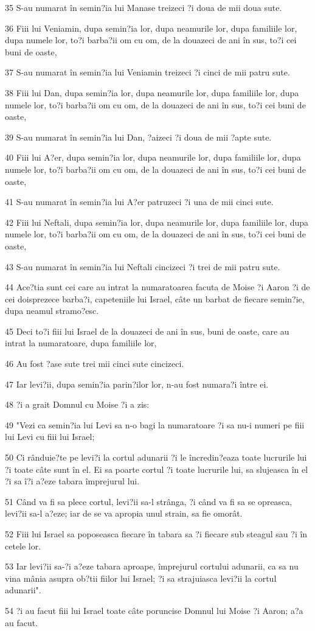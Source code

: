 \par 35 S-au numarat în semin?ia lui Manase treizeci ?i doua de mii doua sute.
\par 36 Fiii lui Veniamin, dupa semin?ia lor, dupa neamurile lor, dupa familiile lor, dupa numele lor, to?i barba?ii om cu om, de la douazeci de ani în sus, to?i cei buni de oaste,
\par 37 S-au numarat în semin?ia lui Veniamin treizeci ?i cinci de mii patru sute.
\par 38 Fiii lui Dan, dupa semin?ia lor, dupa neamurile lor, dupa familiile lor, dupa numele lor, to?i barba?ii om cu om, de la douazeci de ani în sus, to?i cei buni de oaste,
\par 39 S-au numarat în semin?ia lui Dan, ?aizeci ?i doua de mii ?apte sute.
\par 40 Fiii lui A?er, dupa semin?ia lor, dupa neamurile lor, dupa familiile lor, dupa numele lor, to?i barba?ii om cu om, de la douazeci de ani în sus, to?i cei buni de oaste,
\par 41 S-au numarat în semin?ia lui A?er patruzeci ?i una de mii cinci sute.
\par 42 Fiii lui Neftali, dupa semin?ia lor, dupa neamurile lor, dupa familiile lor, dupa numele lor, to?i barba?ii om cu om, de la douazeci de ani în sus, to?i cei buni de oaste,
\par 43 S-au numarat în semin?ia lui Neftali cincizeci ?i trei de mii patru sute.
\par 44 Ace?tia sunt cei care au intrat la numaratoarea facuta de Moise ?i Aaron ?i de cei doisprezece barba?i, capeteniile lui Israel, câte un barbat de fiecare semin?ie, dupa neamul stramo?esc.
\par 45 Deci to?i fiii lui Israel de la douazeci de ani în sus, buni de oaste, care au intrat la numaratoare, dupa familiile lor,
\par 46 Au fost ?ase sute trei mii cinci sute cincizeci.
\par 47 Iar levi?ii, dupa semin?ia parin?ilor lor, n-au fost numara?i între ei.
\par 48 ?i a grait Domnul cu Moise ?i a zis:
\par 49 "Vezi ca semin?ia lui Levi sa n-o bagi la numaratoare ?i sa nu-i numeri pe fiii lui Levi cu fiii lui Israel;
\par 50 Ci rânduie?te pe levi?i la cortul adunarii ?i le încredin?eaza toate lucrurile lui ?i toate câte sunt în el. Ei sa poarte cortul ?i toate lucrurile lui, sa slujeasca în el ?i sa î?i a?eze tabara împrejurul lui.
\par 51 Când va fi sa plece cortul, levi?ii sa-l strânga, ?i când va fi sa se opreasca, levi?ii sa-l a?eze; iar de se va apropia unul strain, sa fie omorât.
\par 52 Fiii lui Israel sa poposeasca fiecare în tabara sa ?i fiecare sub steagul sau ?i în cetele lor.
\par 53 Iar levi?ii sa-?i a?eze tabara aproape, împrejurul cortului adunarii, ca sa nu vina mânia asupra ob?tii fiilor lui Israel; ?i sa strajuiasca levi?ii la cortul adunarii".
\par 54 ?i au facut fiii lui Israel toate câte poruncise Domnul lui Moise ?i Aaron; a?a au facut.

